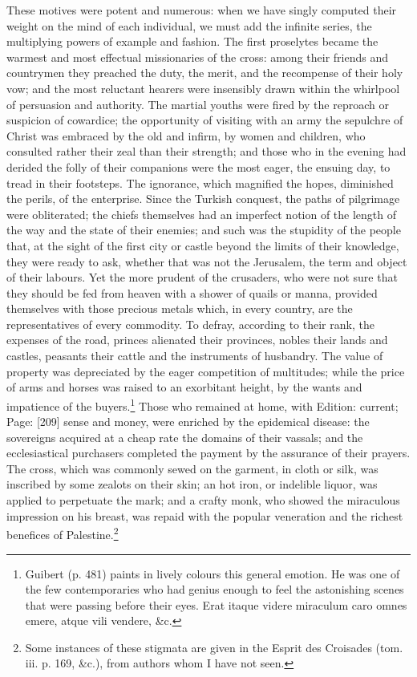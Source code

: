 These motives were potent and numerous: when we have singly computed their weight on the mind of each individual, we must add the infinite series, the multiplying powers of example and fashion. The first proselytes became the warmest and most effectual missionaries of the cross: among their friends and countrymen they preached the duty, the merit, and the recompense of their holy vow; and the most reluctant hearers were insensibly drawn within the whirlpool of persuasion and authority. The martial youths were fired by the reproach or suspicion of cowardice; the opportunity of visiting with an army the sepulchre of Christ was embraced by the old and infirm, by women and children, who consulted rather their zeal than their strength; and those who in the evening had derided the folly of their companions were the most eager, the ensuing day, to tread in their footsteps. The ignorance, which magnified the hopes, diminished the perils, of the enterprise. Since the Turkish conquest, the paths of pilgrimage were obliterated; the chiefs themselves had an imperfect notion of the length of the way and the state of their enemies; and such was the stupidity of the people that, at the sight of the first city or castle beyond the limits of their knowledge, they were ready to ask, whether that was not the Jerusalem, the term and object of their labours. Yet the more prudent of the crusaders, who were not sure that they should be fed from heaven with a shower of quails or manna, provided themselves with those precious metals which, in every country, are the representatives of every commodity. To defray, according to their rank, the expenses of the road, princes alienated their provinces, nobles their lands and castles, peasants their cattle and the instruments of husbandry. The value of property was depreciated by the eager competition of multitudes; while the price of arms and horses was raised to an exorbitant height, by the wants and impatience of the buyers.\footnote{Guibert (p. 481) paints in lively colours this general emotion. He was one of the few contemporaries who had genius enough to feel the astonishing scenes that were passing before their eyes. Erat itaque videre miraculum caro omnes emere, atque vili vendere, \&c.} Those who remained at home, with Edition: current; Page: [209] sense and money, were enriched by the epidemical disease: the sovereigns acquired at a cheap rate the domains of their vassals; and the ecclesiastical purchasers completed the payment by the assurance of their prayers. The cross, which was commonly sewed on the garment, in cloth or silk, was inscribed by some zealots on their skin; an hot iron, or indelible liquor, was applied to perpetuate the mark; and a crafty monk, who showed the miraculous impression on his breast, was repaid with the popular veneration and the richest benefices of Palestine.\footnote{Some instances of these stigmata are given in the Esprit des Croisades (tom. iii. p. 169, \&c.), from authors whom I have not seen.}

